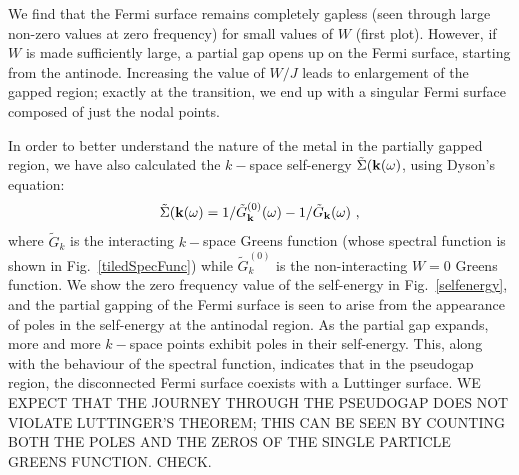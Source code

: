 \documentclass[reprint,hidelinks,onecolumn]{revtex4-2}
\begin{document}
We find that the Fermi surface remains completely gapless (seen through large non-zero values at zero frequency) for small values of \(W\) (first plot). However, if \(W\) is made sufficiently large, a partial gap opens up on the Fermi surface, starting from the antinode. Increasing the value of \(W/J\) leads to enlargement of the gapped region; exactly at the transition, we end up with a singular Fermi surface composed of just the nodal points.

In order to better understand the nature of the metal in the partially gapped region, we have also calculated the \(k-\)space self-energy \(\tilde \Sigma({\bf k}(\omega)\), using Dyson's equation:
\begin{equation}\begin{aligned}
	\tilde \Sigma({\bf k}(\omega) = 1/\tilde G^{(0)}_{\bf k}(\omega) - 1/\tilde G_{\bf k}(\omega)~,
\end{aligned}\end{equation}
where \(\tilde G_k\) is the interacting \(k-\)space Greens function (whose spectral function is shown in Fig.~\ref{tiledSpecFunc}) while \(\tilde G_k^{(0)}\) is the non-interacting \(W=0\) Greens function. We show the zero frequency value of the self-energy in Fig.~\ref{selfenergy}, and the partial gapping of the Fermi surface is seen to arise from the appearance of poles in the self-energy at the antinodal region. As the partial gap expands, more and more \(k-\)space points exhibit poles in their self-energy. This, along with the behaviour of the spectral function, indicates that in the pseudogap region, the disconnected Fermi surface coexists with a Luttinger surface. WE EXPECT THAT THE JOURNEY THROUGH THE PSEUDOGAP DOES NOT VIOLATE LUTTINGER'S THEOREM; THIS CAN BE SEEN BY COUNTING BOTH THE POLES AND THE ZEROS OF THE SINGLE PARTICLE GREENS FUNCTION. CHECK.
\end{document}
